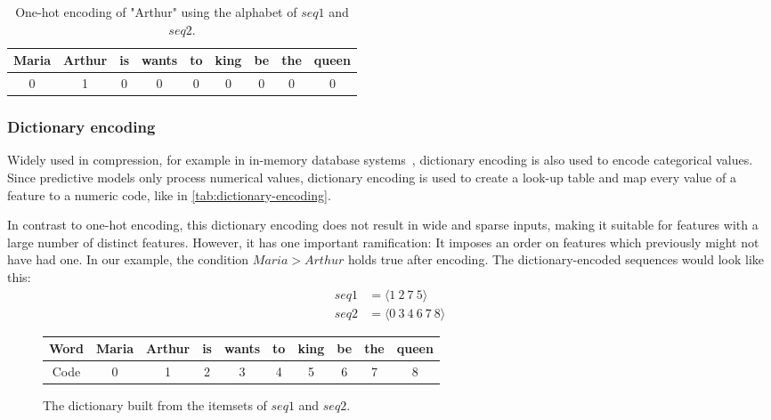 \begin{table}[ht]
    \centering
    \begin{tabular}{c|c|c|c|c|c|c|c|c}
        Maria & Arthur & is & wants & to & king & be & the & queen\\
        \hline
        0 & 1 & 0 & 0 & 0 & 0 & 0 & 0 & 0\\
    \end{tabular}
    \caption{One-hot encoding of "Arthur" using the alphabet of $seq1$ and $seq2$.}
    \label{tab:one-hot}
\end{table}

\subsubsection*{Dictionary encoding}
Widely used in compression, for example in in-memory database systems~\cite{plattner2012memory}, dictionary encoding is also used to encode categorical values. Since predictive models only process numerical values, dictionary encoding is used to create a look-up table and map every value of a feature to a numeric code, like in \autoref{tab:dictionary-encoding}.

In contrast to one-hot encoding, this dictionary encoding does not result in wide and sparse inputs, making it suitable for features with a large number of distinct features. However, it has one important ramification: It imposes an order on features which previously might not have had one. In our example, the condition $Maria > Arthur$ holds true after encoding. The dictionary-encoded sequences would look like this:
\begin{equation*}
    \begin{split}
        seq1 &= \langle1\ 2\ 7\ 5\rangle\\
        seq2 &= \langle0\ 3\ 4\ 6\ 7\ 8\rangle
    \end{split}
\end{equation*}

\begin{figure}
    \centering
    \begin{tabular}{c|ccccccccc}
        Word & Maria & Arthur & is & wants & to & king & be & the & queen\\
        \hline
        Code & 0 & 1 & 2 & 3 & 4 & 5 & 6 & 7 & 8
    \end{tabular}
    \caption{The dictionary built from the itemsets of $seq1$ and $seq2$.}
    \label{tab:dictionary-encoding}
\end{figure}

